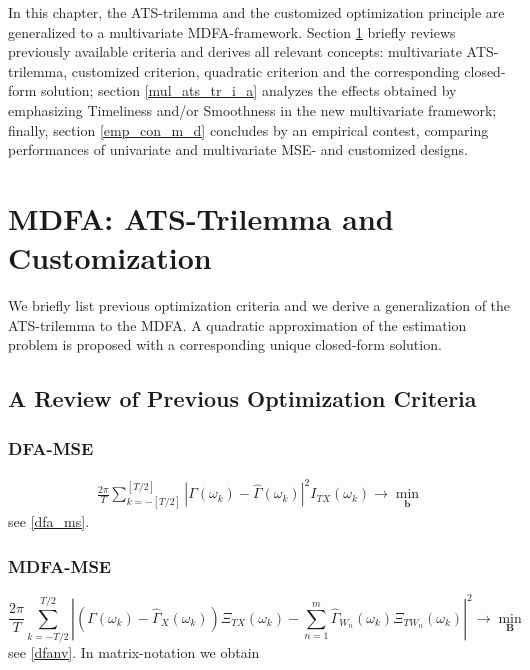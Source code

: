 \documentclass[a4paper]{book}
\begin{document}
In this chapter, the ATS-trilemma and the customized optimization principle are generalized to a multivariate MDFA-framework. Section \ref{ats_trilemma_and_cust} briefly reviews previously available criteria and derives all relevant concepts: multivariate ATS-trilemma, customized criterion, quadratic criterion and the corresponding closed-form solution; section \ref{mul_ats_tr_i_a} analyzes the effects obtained by emphasizing Timeliness and/or Smoothness in the new multivariate framework; finally, section \ref{emp_con_m_d} concludes by an empirical contest, comparing performances of univariate and multivariate MSE- and customized designs.




\section{MDFA: ATS-Trilemma and Customization}\label{ats_trilemma_and_cust}


We briefly list previous optimization criteria and we derive a generalization of the ATS-trilemma to the MDFA. A quadratic approximation of the estimation problem is proposed with a corresponding unique closed-form solution.  


\subsection{A Review of Previous Optimization Criteria}


\subsubsection{DFA-MSE}

\begin{eqnarray}
\frac{2\pi}{T}\sum_{k=-[T/2]}^{[T/2]}\left|\Gamma(\omega_k)-\hat{\Gamma}(\omega_k) \right|^2 I_{TX}(\omega_k)\to\min_{\mathbf{b}} \label{dfa_ms_e}
\end{eqnarray}
see \ref{dfa_ms}.



\subsubsection{MDFA-MSE}

\begin{equation}\label{dfanv_e}
\frac{2\pi}{T} \sum_{k=-T/2}^{T/2}
\left|\left(\Gamma(\omega_k)-\hat{\Gamma}_X(\omega_k)\right)\Xi_{T
X}(\omega_k)-\sum_{n=1}^m
\hat{\Gamma}_{W_n}(\omega_k)\Xi_{TW_n}(\omega_k)\right|^2 \to \min_{\mathbf{B}}
\end{equation}
see \ref{dfanv}. In matrix-notation we obtain
\end{document}
